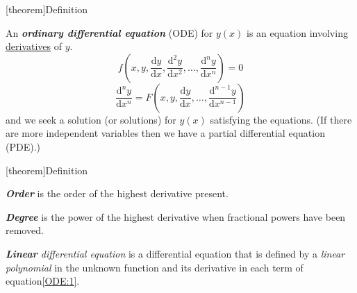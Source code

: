 \documentclass[12pt]{report}
\theoremstyle{definition}
\begin{document}
[theorem]{Definition}
\begin{ODE}
    An \textbf{\emph{ordinary differential equation}} (ODE) for $y (x)$
    is an equation involving \underline{derivatives} of $y$.
    \begin{equation}\label{ODE:1}
        f(x, y, \frac{\mathrm{d} y}{\mathrm{d}x}, \frac{\mathrm{d}^{2} y}{\mathrm{d}x^{2}}, \ldots,
        \frac{\mathrm{d}^{n} y}{\mathrm{d}x^{n}}) = 0
        \end{equation}
    \[
        \frac{\mathrm{d}^{n} y}{\mathrm{d}x^{n}} = 
        F(x, y, \frac{\mathrm{d} y}{\mathrm{d}x}, \ldots, \frac{\mathrm{d}^{n-1} y}{\mathrm{d}x^{n-1}})
    \]
    and we seek a solution (or solutions) for $y(x)$ satisfying the equations.
    (If there are more independent variables then we have a partial differential equation (PDE).)
\end{ODE}

[theorem]{Definition}
\begin{order and power}
    \;

    \textbf{\emph{Order}} is the order of the highest derivative present.

    \textbf{\emph{Degree}} is the power of the highest derivative when fractional powers have been removed.

    \emph{\textbf{Linear} differential equation} is a differential equation that is defined by a \emph{linear polynomial}
    in the unknown function and its derivative in each term of equation\eqref{ODE:1}.
\end{order and power}
\end{document}
